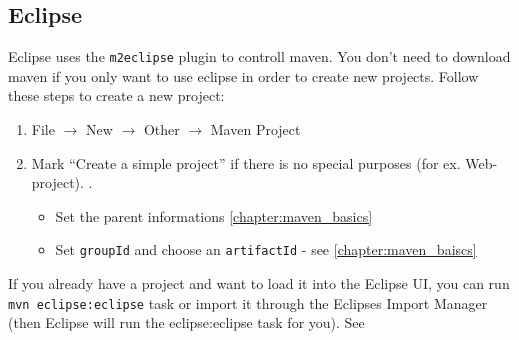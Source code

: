 \subsection{Eclipse}
Eclipse uses the \lstinline{m2eclipse} plugin to controll maven. You don't need to download maven if you only want to use eclipse in order to create new projects.
Follow these steps to create a new project:
\begin{enumerate}
	\item File $\rightarrow$ New $\rightarrow$ Other $\rightarrow$ Maven Project
	\item Mark “Create a simple project” if there is no special purposes (for ex. Web-project). . 
	\begin{itemize}
		\item Set the parent informations \ref{chapter:maven_basics}
		\item Set \lstinline{groupId} and choose an \lstinline{artifactId} - see \ref{chapter:maven_baiscs}
	\end{itemize}
\end{enumerate}

If you already have a project and want to load it into the Eclipse UI, you can run \lstinline{mvn eclipse:eclipse} task or import it through the Eclipses Import Manager (then Eclipse will run the eclipse:eclipse task for you). See  